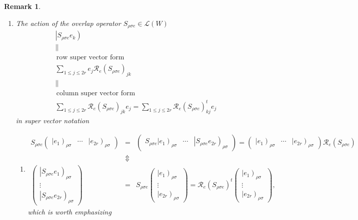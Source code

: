 \documentclass[aps,preprint]{revtex4}
\newtheorem{remark}[theorem]{Remark}
\begin{document}
\begin{remark}
\begin{enumerate}
\item The action of the overlap operator $S_{\rho \sigma e}\in \mathcal{L}%
\left( W\right) $ 
\begin{gather}
\left\vert S_{\rho \sigma e}e_{k}\right) \\
\parallel \\
\,\text{row super vector form} \\
\sum_{1\leq j\leq 2r}e_{j}\mathcal{R}_{e}\left( S_{\rho \sigma e}\right)
_{jk} \\
\parallel \\
\,\text{column super vector form} \\
\sum_{1\leq j\leq 2r}\mathcal{R}_{e}\left( S_{\rho \sigma e}\right)
_{jk}e_{j}=\sum_{1\leq j\leq 2r}\mathcal{R}_{e}\left( S_{\rho \sigma
e}\right) _{kj}^{t}e_{j}
\end{gather}
in super vector notation

\begin{enumerate}
\item 
\begin{eqnarray}
S_{\rho \sigma e}\left( 
\begin{array}{ccc}
\left\vert e_{1}\right) _{\rho \sigma } & \cdots & \left\vert e_{2r}\right)
_{\rho \sigma }%
\end{array}%
\right) &=&\left( 
\begin{array}{ccc}
S_{\rho \sigma e}\left\vert e_{1}\right) _{\rho \sigma } & \cdots & 
\left\vert S_{\rho \sigma e}e_{2r}\right) _{\rho \sigma }%
\end{array}%
\right) =\left( 
\begin{array}{ccc}
\left\vert e_{1}\right) _{\rho \sigma } & \cdots & \left\vert e_{2r}\right)
_{\rho \sigma }%
\end{array}%
\right) \mathcal{R}_{e}\left( S_{\rho \sigma e}\right) \\
&\Updownarrow & \\
\left( 
\begin{array}{c}
\left\vert S_{\rho \sigma e}e_{1}\right) _{\rho \sigma } \\ 
\vdots \\ 
\left\vert S_{\rho \sigma e}e_{2r}\right) _{\rho \sigma }%
\end{array}%
\right) &=&S_{\rho \sigma e}\left( 
\begin{array}{c}
\left\vert e_{1}\right) _{\rho \sigma } \\ 
\vdots \\ 
\left\vert e_{2r}\right) _{\rho \sigma }%
\end{array}%
\right) =\mathcal{R}_{e}\left( S_{\rho \sigma e}\right) ^{t}\left( 
\begin{array}{c}
\left\vert e_{1}\right) _{\rho \sigma } \\ 
\vdots \\ 
\left\vert e_{2r}\right) _{\rho \sigma }%
\end{array}%
\right) ,
\end{eqnarray}%
which is worth emphasizing


\end{enumerate}
\end{enumerate}
\end{remark}
\end{document}
